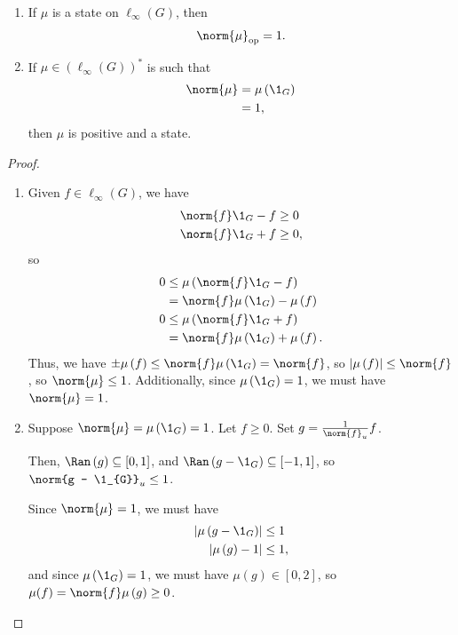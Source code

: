 \documentclass[10pt]{mypackage}
\begin{document}
\begin{lemma}\hfill
  \begin{enumerate}[(1)]
    \item If $\mu$ is a state on $\ell_{\infty}\left(G\right)$, then
      \begin{align*}
        \norm{\mu}_{\text{op}} = 1.
      \end{align*}
    \item If $\mu\in \left(\ell_{\infty}\left(G\right)\right)^{\ast}$ is such that
      \begin{align*}
        \norm{\mu} &= \mu\left(\1_{G}\right)\\
                   &= 1,
      \end{align*}
      then $\mu$ is positive and a state.
  \end{enumerate}
\end{lemma}
\begin{proof}\hfill
  \begin{enumerate}[(1)]
    \item Given $f\in \ell_{\infty}\left(G\right)$, we have
      \begin{align*}
        \norm{f}\1_{G} - f &\geq 0\\
        \norm{f}\1_{G} + f &\geq 0,
      \end{align*}
      so
      \begin{align*}
        0 &\leq \mu\left(\norm{f}\1_{G} - f\right)\\
          &= \norm{f}\mu\left(\1_{G}\right) - \mu\left(f\right)\\
        0 &\leq \mu\left(\norm{f}\1_{G} + f\right)\\
          &= \norm{f}\mu\left(\1_{G}\right) + \mu\left(f\right).
      \end{align*}
      Thus, we have $\pm \mu\left(f\right) \leq \norm{f}\mu\left(\1_G\right) = \norm{f}$, so $\left\vert \mu\left(f\right) \right\vert \leq \norm{f}$, so $\norm{\mu}\leq 1$. Additionally, since $\mu\left(\1_{G}\right) = 1$, we must have $\norm{\mu} = 1$.
    \item Suppose $\norm{\mu} = \mu\left(\1_{G}\right) = 1$. Let $f \geq 0$. Set $g = \frac{1}{\norm{f}_{u}} f$.\newline

      Then, $\Ran\left(g\right) \subseteq [0,1]$, and $\Ran\left(g-\1_{G}\right) \subseteq [-1,1]$, so $\norm{g - \1_{G}}_{u} \leq 1$.\newline

      Since $\norm{\mu} = 1$, we must have
      \begin{align*}
        \left\vert \mu\left(g - \1_{G}\right) \right\vert &\leq 1\\
        \left\vert \mu\left(g\right) - 1 \right\vert &\leq 1,
      \end{align*}
      and since $\mu\left(\1_{G}\right) = 1$, we must have $\mu\left(g\right)\in [0,2]$, so $\mu(f) = \norm{f}\mu\left(g\right) \geq 0$.
  \end{enumerate}
\end{proof}
\end{document}
